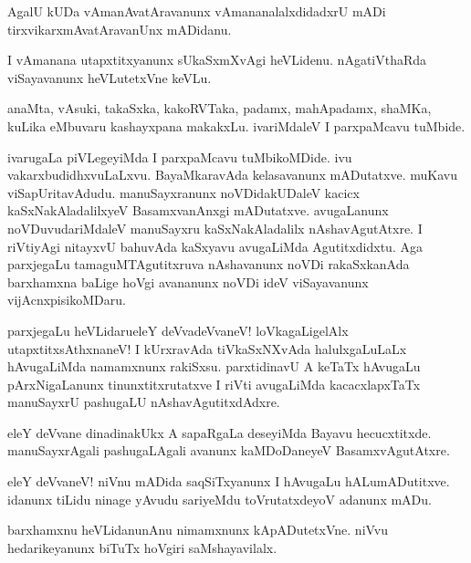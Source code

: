 \begin{mng}
AgalU kUDa vAmanAvatAravanunx vAmananalalxdidadxrU mADi tirxvikarxmAvatAravanUnx mADidanu.
\end{mng}

\begin{mng}
I vAmanana utapxtitxyanunx sUkaSxmXvAgi heVLidenu. nAgatiVthaRda viSayavanunx heVLutetxVne keVLu.
\end{mng}

\begin{mng}
anaMta, vAsuki, takaSxka, kakoRVTaka, padamx, mahApadamx, shaMKa, kuLika eMbuvaru kashayxpana makakxLu. ivariMdaleV I parxpaMcavu tuMbide.
\end{mng}

\begin{mng}
ivarugaLa piVLegeyiMda I parxpaMcavu tuMbikoMDide. ivu vakarxbudidhxvuLaLxvu. BayaMkaravAda kelasavanunx mADutatxve. muKavu viSapUritavAdudu. manuSayxranunx noVDidakUDaleV kacicx kaSxNakAladalilxyeV BasamxvanAnxgi mADutatxve. avugaLanunx noVDuvudariMdaleV manuSayxru kaSxNakAladalilx nAshavAgutAtxre. I riVtiyAgi nitayxvU bahuvAda kaSxyavu avugaLiMda Agutitxdidxtu. Aga parxjegaLu tamaguMTAgutitxruva nAshavanunx noVDi rakaSxkanAda barxhamxna baLige hoVgi avananunx noVDi ideV viSayavanunx vijAcnxpisikoMDaru.
\end{mng}

\begin{mng}
parxjegaLu heVLidaru\mdash eleY deVvadeVvaneV! loVkagaLigelAlx utapxtitxsAthxnaneV! I kUrxravAda tiVkaSxNXvAda halulxgaLuLaLx hAvugaLiMda namamxnunx rakiSxsu. parxtidinavU A keTaTx hAvugaLu pArxNigaLanunx tinunxtitxrutatxve I riVti avugaLiMda kacacxlapxTaTx manuSayxrU pashugaLU nAshavAgutitxdAdxre.
\end{mng}

\begin{mng}
eleY deVvane dinadinakUkx A sapaRgaLa deseyiMda Bayavu hecucxtitxde. manuSayxrAgali pashugaLAgali avanunx kaMDoDaneyeV BasamxvAgutAtxre.
\end{mng}

\begin{mng}
eleY deVvaneV! niVnu mADida saqSiTxyanunx I hAvugaLu hALumADutitxve. idanunx tiLidu ninage yAvudu sariyeMdu toVrutatxdeyoV adanunx mADu.
\end{mng}

\begin{mng}
barxhamxnu heVLidanu\mdash nAnu nimamxnunx kApADutetxVne. niVvu hedarikeyanunx biTuTx hoVgiri saMshayavilalx.
\end{mng}

